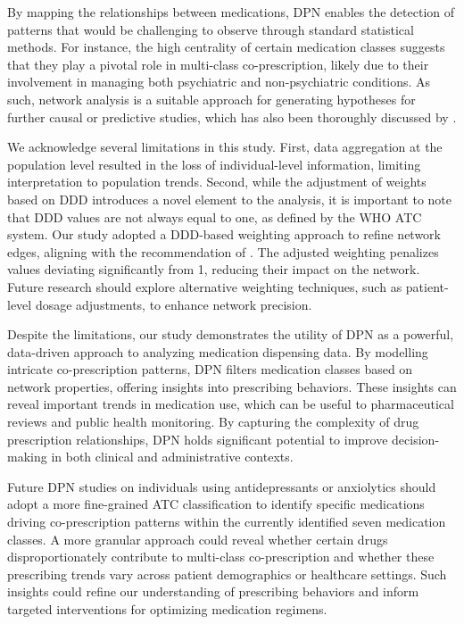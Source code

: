 \documentclass[
  authoryear,
  review]{elsarticle}
\begin{document}
By mapping the relationships between medications, DPN enables the
detection of patterns that would be challenging to observe through
standard statistical methods. For instance, the high centrality of
certain medication classes suggests that they play a pivotal role in
multi-class co-prescription, likely due to their involvement in managing
both psychiatric and non-psychiatric conditions. As such, network
analysis is a suitable approach for generating hypotheses for further
causal or predictive studies, which has also been thoroughly discussed
by \citet{Askar2021}.

We acknowledge several limitations in this study. First, data
aggregation at the population level resulted in the loss of
individual-level information, limiting interpretation to population
trends. Second, while the adjustment of weights based on DDD introduces
a novel element to the analysis, it is important to note that DDD values
are not always equal to one, as defined by the WHO ATC system. Our study
adopted a DDD-based weighting approach to refine network edges, aligning
with the recommendation of \citet{Cavallo2012}. The adjusted weighting
penalizes values deviating significantly from 1, reducing their impact
on the network. Future research should explore alternative weighting
techniques, such as patient-level dosage adjustments, to enhance network
precision.

Despite the limitations, our study demonstrates the utility of DPN as a
powerful, data-driven approach to analyzing medication dispensing data.
By modelling intricate co-prescription patterns, DPN filters medication
classes based on network properties, offering insights into prescribing
behaviors. These insights can reveal important trends in medication use,
which can be useful to pharmaceutical reviews and public health
monitoring. By capturing the complexity of drug prescription
relationships, DPN holds significant potential to improve
decision-making in both clinical and administrative contexts.

Future DPN studies on individuals using antidepressants or anxiolytics
should adopt a more fine-grained ATC classification to identify specific
medications driving co-prescription patterns within the currently
identified seven medication classes. A more granular approach could
reveal whether certain drugs disproportionately contribute to
multi-class co-prescription and whether these prescribing trends vary
across patient demographics or healthcare settings. Such insights could
refine our understanding of prescribing behaviors and inform targeted
interventions for optimizing medication regimens.
\end{document}
